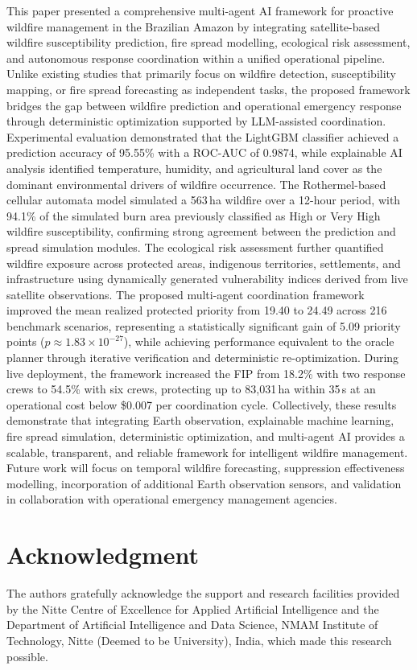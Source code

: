 \documentclass{ieeeaccess}
\begin{document}
This paper presented a comprehensive multi-agent AI framework for proactive wildfire management in the Brazilian Amazon by integrating satellite-based wildfire susceptibility prediction, fire spread modelling, ecological risk assessment, and autonomous response coordination within a unified operational pipeline. Unlike existing studies that primarily focus on wildfire detection, susceptibility mapping, or fire spread forecasting as independent tasks, the proposed framework bridges the gap between wildfire prediction and operational emergency response through deterministic optimization supported by LLM-assisted coordination. Experimental evaluation demonstrated that the LightGBM classifier achieved a prediction accuracy of 95.55\% with a ROC-AUC of 0.9874, while explainable AI analysis identified temperature, humidity, and agricultural land cover as the dominant environmental drivers of wildfire occurrence. The Rothermel-based cellular automata model simulated a 563\,ha wildfire over a 12-hour period, with 94.1\% of the simulated burn area previously classified as High or Very High wildfire susceptibility, confirming strong agreement between the prediction and spread simulation modules. The ecological risk assessment further quantified wildfire exposure across protected areas, indigenous territories, settlements, and infrastructure using dynamically generated vulnerability indices derived from live satellite observations. The proposed multi-agent coordination framework improved the mean realized protected priority from 19.40 to 24.49 across 216 benchmark scenarios, representing a statistically significant gain of 5.09 priority points ($p \approx 1.83\times10^{-27}$), while achieving performance equivalent to the oracle planner through iterative verification and deterministic re-optimization. During live deployment, the framework increased the FIP from 18.2\% with two response crews to 54.5\% with six crews, protecting up to 83,031\,ha within 35\,s at an operational cost below \$0.007 per coordination cycle. Collectively, these results demonstrate that integrating Earth observation, explainable machine learning, fire spread simulation, deterministic optimization, and multi-agent AI provides a scalable, transparent, and reliable framework for intelligent wildfire management. Future work will focus on temporal wildfire forecasting, suppression effectiveness modelling, incorporation of additional Earth observation sensors, and validation in collaboration with operational emergency management agencies.

\section*{Acknowledgment}
The authors gratefully acknowledge the support and research facilities provided by the Nitte Centre of Excellence for Applied Artificial Intelligence and the Department of Artificial Intelligence and Data Science, NMAM Institute of Technology, Nitte (Deemed to be University), India, which made this research possible.
\end{document}
